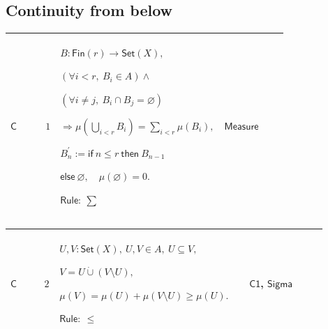 \documentclass[12pt,reqno]{amsart}
\theoremstyle{blueplain}
\numberwithin{equation}{section}
\newlength{\FATOUOneColumnBody}
\begin{document}
\subsection{\protect\scriptsize Continuity from below}

{\scriptsize \setlength{\parskip}{0pt}\nointerlineskip
\noindent 
\begin{tabular}{|@{}>{\centering\arraybackslash}m{\FATOUOneColumnBody}|}
\hline
$\displaystyle \mathsf{Context\_C}:=$\par$\displaystyle E:\mathsf{PosNat}\to%
\mathsf{Set}(X),$\par$\displaystyle (\forall k:\mathsf{PosNat},\ E_k\in A)$%
\par$\displaystyle \land(\forall k:\mathsf{PosNat},\ E_k\subseteq E_{k+1}).$
\\ \hline
\end{tabular}%
}

{\scriptsize \setlength{\parskip}{0pt}\nointerlineskip
\noindent 
\begin{tabular}{|@{}>{\centering\arraybackslash}m{0.10658\linewidth}|>{\centering\arraybackslash}m{0.03553\linewidth}|>{\centering\arraybackslash}m{0.52105\linewidth}|>{\centering\arraybackslash}m{0.23684\linewidth}|}
\hline
\hypertarget{proof:C1}{$\displaystyle \mathsf{C}$} & $\displaystyle 1$ & $%
\displaystyle B:\mathsf{Fin}(r)\to\mathsf{Set}(X),$\par$\displaystyle %
(\forall i<r,\ B_i\in A)\land$\par$\displaystyle (\forall i\ne j,\ B_i\cap
B_j=\varnothing)$\par$\displaystyle \Rightarrow\mu(\bigcup_{i<r}B_i)=%
\sum_{i<r}\mu(B_i),$\par$\displaystyle B_n^\prime:=\mathsf{if}\ n\le r\ 
\mathsf{then}\ B_{n-1}$\par$\displaystyle \mathsf{else}\
\varnothing,\quad\mu(\varnothing)=0.$\par$\displaystyle \mathsf{Rule}:\ \sum$
& \hyperlink{ax:Measure}{$\displaystyle \mathsf{Measure}$} \\ \hline
\end{tabular}%
}

{\scriptsize \setlength{\parskip}{0pt}\nointerlineskip
\noindent 
\begin{tabular}{|@{}>{\centering\arraybackslash}m{0.10658\linewidth}|>{\centering\arraybackslash}m{0.03553\linewidth}|>{\centering\arraybackslash}m{0.52105\linewidth}|>{\centering\arraybackslash}m{0.23684\linewidth}|}
\hline
\hypertarget{proof:C2}{$\displaystyle \mathsf{C}$} & $\displaystyle 2$ & $%
\displaystyle U,V:\mathsf{Set}(X),\ U,V\in A,\ U\subseteq V,$\par$%
\displaystyle V=U\mathbin{\dot\cup}(V\setminus U),$\par$\displaystyle %
\mu(V)=\mu(U)+\mu(V\setminus U)\ge\mu(U).$\par$\displaystyle \mathsf{Rule}:\
\le$ & \hyperlink{proof:C1}{$\displaystyle \mathsf{C1}$}, \hyperlink{ax:Sigma}%
{$\displaystyle \mathsf{Sigma}$} \\ \hline
\end{tabular}%
}
\end{document}
